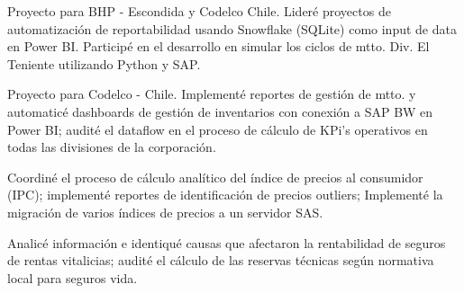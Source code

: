 \documentclass[10pt, a4paper, ragged2e, withhyper, spanish]{altacv}
\begin{document}
\begin{paracol}{2}
{\justify Proyecto para BHP - Escondida y Codelco Chile. Lideré proyectos de automatización de reportabilidad usando Snowflake (SQLite) como input de data en Power BI. Participé en el desarrollo en simular los ciclos de mtto. Div. El Teniente utilizando Python y SAP.}\\
{}

\divider
\smallskip

{\justify Proyecto para Codelco - Chile. Implementé reportes de gestión de mtto. y automaticé dashboards de gestión de inventarios con conexión a SAP BW en Power BI; audité el dataflow en el proceso de cálculo de KPi's operativos en todas las divisiones de la corporación.}\\
{}

\divider
\smallskip


{\justify Coordiné el proceso de cálculo analítico del índice de precios al consumidor (IPC); implementé reportes de identificación de precios outliers; Implementé la migración de varios índices de precios a un servidor SAS.}\\
{}

\divider
\smallskip


{\justify Analicé información e identiqué causas que afectaron la rentabilidad de seguros de rentas vitalicias; audité el cálculo de las reservas técnicas según normativa local para seguros vida.}\\
{}

\divider

\newpage


\end{paracol}
\end{document}
